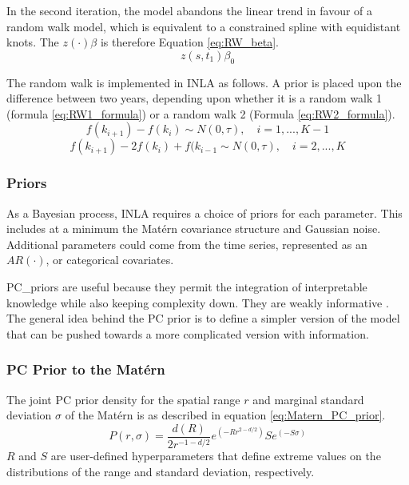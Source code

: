 In the second iteration, the model abandons the linear trend in favour of a random walk model, which is equivalent to a constrained spline with equidistant knots.  The $z(\cdot)\beta$ is therefore Equation \ref{eq:RW_beta}.
\begin{equation} \label{eq:RW_beta}
z(s,t_1)\beta_0
\end{equation}

The random walk is implemented in \ac{INLA} as follows.  A prior is placed upon the difference between two years, depending upon whether it is a random walk 1 (formula \ref{eq:RW1_formula}) or a random walk 2 (Formula \ref{eq:RW2_formula}).
\begin{equation} \label{eq:RW1_formula}
f(k_{i + 1}) - f(k_i) \sim N(0,\tau), \quad i = 1, ..., K-1
\end{equation}
\begin{equation} \label{eq:RW2_formula}
f(k_{i+1}) - 2f(k_i) + f(k_{i-1} \sim N(0, \tau), \quad i = 2, ..., K
\end{equation}


\subsubsection*{Priors} \label{subsubsec:Priors}
As a Bayesian process, \ac{INLA} requires a choice of priors for each parameter.  This includes at a minimum the  Mat\'{e}rn covariance structure and Gaussian noise.  Additional parameters could come from the time series, represented as an $AR(\cdot)$, or categorical covariates.

\Gls{PC_priors} are useful because they permit the integration of interpretable knowledge while also keeping complexity down.  They are weakly informative  \citep{fuglstad2017constructing, simpson2017penalising}.
The general idea behind the PC prior is to define a simpler version of the model that can be pushed towards a more complicated version with information.   


\subsubsection*{PC Prior to the Mat\'{e}rn}
\label{subsubsec:pcprioronmatern}
The joint PC prior density for the spatial range $r$ and marginal standard deviation $\sigma$ of the Mat\'{e}rn is as described in equation \ref{eq:Matern_PC_prior}.
\begin{equation} \label{eq:Matern_PC_prior}
P(r, \sigma) = \frac{d(R)}{2 r^{-1-d/2}} e^{(-R r  ^{2 -d/2})} S e^{(-S \sigma)}
\end{equation}
$R$ and $S$ are user-defined hyperparameters that define extreme values on the distributions of the range and standard deviation, respectively.

